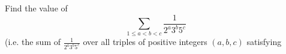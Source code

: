 Find the value of $$\sum_{1\le a<b<c} \frac{1}{2^a3^b5^c}$$(i.e. the sum of $\frac{1}{2^a3^b5^c}$ over all triples of positive integers $(a, b, c)$ satisfying 